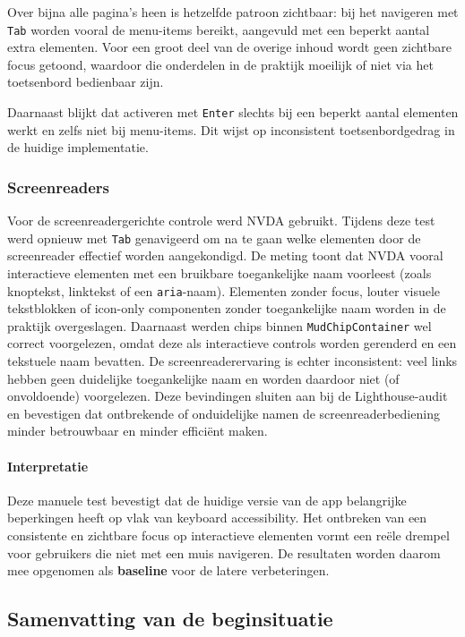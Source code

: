 Over bijna alle pagina's heen is hetzelfde patroon zichtbaar: bij het navigeren met \texttt{Tab} worden vooral de menu-items bereikt, aangevuld met een beperkt aantal extra elementen. Voor een groot deel van de overige inhoud wordt geen zichtbare focus getoond, waardoor die onderdelen in de praktijk moeilijk of niet via het toetsenbord bedienbaar zijn.

Daarnaast blijkt dat activeren met \texttt{Enter} slechts bij een beperkt aantal elementen werkt en zelfs niet bij menu-items. Dit wijst op inconsistent toetsenbordgedrag in de huidige implementatie.


\subsubsection{Screenreaders}
Voor de screenreadergerichte controle werd NVDA gebruikt. Tijdens deze test werd opnieuw met \texttt{Tab} genavigeerd om na te gaan welke elementen door de screenreader effectief worden aangekondigd. De meting toont dat NVDA vooral interactieve elementen met een bruikbare toegankelijke naam voorleest (zoals knoptekst, linktekst of een \texttt{aria}-naam). Elementen zonder focus, louter visuele tekstblokken of icon-only componenten zonder toegankelijke naam worden in de praktijk overgeslagen. Daarnaast werden chips binnen \texttt{MudChipContainer} wel correct voorgelezen, omdat deze als interactieve controls worden gerenderd en een tekstuele naam bevatten. De screenreaderervaring is echter inconsistent: veel links hebben geen duidelijke toegankelijke naam en worden daardoor niet (of onvoldoende) voorgelezen. Deze bevindingen sluiten aan bij de Lighthouse-audit en bevestigen dat ontbrekende of onduidelijke namen de screenreaderbediening minder betrouwbaar en minder efficiënt maken.

\paragraph{Interpretatie}
Deze manuele test bevestigt dat de huidige versie van de app belangrijke beperkingen heeft op vlak van keyboard accessibility. Het ontbreken van een consistente en zichtbare focus op interactieve elementen vormt een reële drempel voor gebruikers die niet met een muis navigeren. De resultaten worden daarom mee opgenomen als \textbf{baseline} voor de latere verbeteringen.

\subsection{Samenvatting van de beginsituatie}
\label{subsec:samenvatting-beginsituatie}

